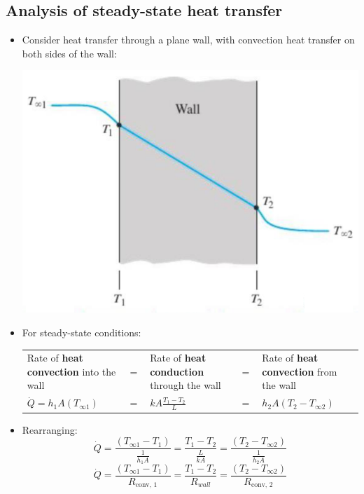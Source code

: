 \documentclass[11pt]{article}
\begin{document}
 \newpage
\subsection{Analysis of steady-state heat transfer}
\label{sec:orga1e2db8}
\begin{itemize}
\item Consider heat transfer through a plane wall, with convection heat transfer on both sides of the wall:
\begin{center}
\includegraphics[width=.9\linewidth]{./images/analysis-of-steady-state-heat-transfer.png}
\end{center}
\item For steady-state conditions:
\begin{center}
\begin{tabular}{>{\centering\arraybackslash}m{10em} >{\centering\arraybackslash}m{1em} >{\centering\arraybackslash}m{10em} >{\centering\arraybackslash}m{1em} >{\centering\arraybackslash}m{10em}}
Rate of \textbf{heat convection} into the wall & \(=\) & Rate of \textbf{heat conduction} through the wall & \(=\) & Rate of \textbf{heat convection} from the wall\\
\(\dot{Q} = h_1 A (T_{\infty 1})\) & \(=\) & \(kA \frac{T_1 - T_2}{L}\) & \(=\) & \(h_2 A (T_2 - T_{\infty 2})\)\\
\end{tabular}
\end{center}
\item Rearranging:
\[\dot{Q} = \frac{(T_{\infty 1} - T_1)}{\frac{1}{h_1 A}} = \frac{T_1 - T_2}{\frac{L}{kA}} = \frac{(T_2 - T_{\infty 2})}{\frac{1}{h_2 A}}\]
\[\dot{Q} = \frac{(T_{\infty 1} - T_1)}{R_{\text{conv, 1}}} = \frac{T_1 - T_2}{R_{wall}} = \frac{(T_2 - T_{\infty 2})}{R_{\text{conv, 2}}}\]
\end{itemize}
\end{document}
